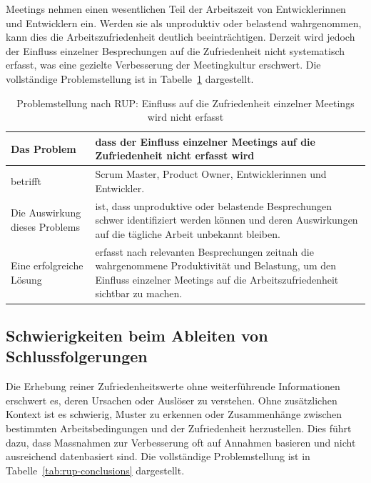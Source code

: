 \documentclass[12pt,a4paper]{report}
\begin{document}
Meetings nehmen einen wesentlichen Teil der Arbeitszeit von Entwicklerinnen und Entwicklern ein. Werden sie als unproduktiv oder
belastend wahrgenommen, kann dies die Arbeitszufriedenheit deutlich beeinträchtigen. Derzeit wird jedoch der Einfluss einzelner
Besprechungen auf die Zufriedenheit nicht systematisch erfasst, was eine gezielte Verbesserung der Meetingkultur erschwert. Die
vollständige Problemstellung ist in Tabelle~\ref{tab:rup-meetings} dargestellt.

\begin{table}[H]
  \caption{Problemstellung nach RUP: Einfluss auf die Zufriedenheit einzelner Meetings wird nicht erfasst}
  \label{tab:rup-meetings}
  \centering
  \begin{tabularx}{\textwidth}{>{\raggedright\arraybackslash}p{}|X}
    \hline
    Das Problem & dass der Einfluss einzelner Meetings auf die Zufriedenheit nicht erfasst wird \\ \hline

    betrifft & Scrum Master, Product Owner, Entwicklerinnen und Entwickler. \\ \hline

    Die Auswirkung dieses Problems & ist, dass unproduktive oder belastende Besprechungen schwer identifiziert werden können und
    deren Auswirkungen auf die tägliche Arbeit unbekannt bleiben. \\ \hline

    Eine erfolgreiche Lösung & erfasst nach relevanten Besprechungen zeitnah die wahrgenommene Produktivität und Belastung, um
    den Einfluss einzelner Meetings auf die Arbeitszufriedenheit sichtbar zu machen. \\ \hline
  \end{tabularx}
\end{table}

\subsection{Schwierigkeiten beim Ableiten von Schlussfolgerungen}

Die Erhebung reiner Zufriedenheitswerte ohne weiterführende Informationen erschwert es, deren Ursachen oder Auslöser zu verstehen.  
Ohne zusätzlichen Kontext ist es schwierig, Muster zu erkennen oder Zusammenhänge zwischen bestimmten Arbeitsbedingungen und der
Zufriedenheit herzustellen. Dies führt dazu, dass Massnahmen zur Verbesserung oft auf Annahmen basieren und nicht ausreichend
datenbasiert sind. Die vollständige Problemstellung ist in Tabelle~\ref{tab:rup-conclusions} dargestellt.
\end{document}

